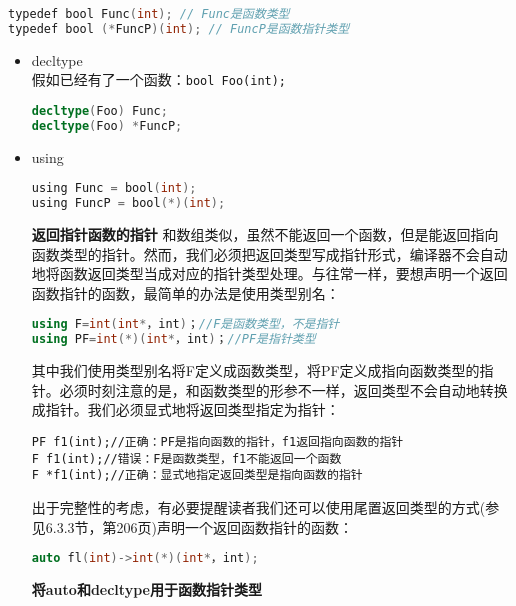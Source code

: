 \documentclass[
  a4paper,
  oneside,tablecaptionabove
]{scrbook}
\begin{document}
\begin{lstlisting}[language={C++}]
typedef bool Func(int); // Func是函数类型
typedef bool (*FuncP)(int); // FuncP是函数指针类型
\end{lstlisting}

\begin{itemize}
\item
  decltype\\
  假如已经有了一个函数：\lstinline!bool Foo(int);!

\begin{lstlisting}[language={C++}]
decltype(Foo) Func;
decltype(Foo) *FuncP;
\end{lstlisting}
\item
  using

\begin{lstlisting}[language={C++}]
using Func = bool(int);
using FuncP = bool(*)(int);
\end{lstlisting}

  \textbf{返回指针函数的指针}
  和数组类似，虽然不能返回一个函数，但是能返回指向函数类型的指针。然而，我们必须把返回类型写成指针形式，编译器不会自动地将函数返回类型当成对应的指针类型处理。与往常一样，要想声明一个返回函数指针的函数，最简单的办法是使用类型别名：

\begin{lstlisting}[language={C++}]
using F=int(int*，int)；//F是函数类型，不是指针
using PF=int(*)(int*，int)；//PF是指针类型
\end{lstlisting}

  其中我们使用类型别名将F定义成函数类型，将PF定义成指向函数类型的指针。必须时刻注意的是，和函数类型的形参不一样，返回类型不会自动地转换成指针。我们必须显式地将返回类型指定为指针：

\begin{lstlisting}
PF f1(int);//正确：PF是指向函数的指针，f1返回指向函数的指针
F f1(int);//错误：F是函数类型，f1不能返回一个函数
F *f1(int);//正确：显式地指定返回类型是指向函数的指针
\end{lstlisting}

  出于完整性的考虑，有必要提醒读者我们还可以使用尾置返回类型的方式(参见6.3.3节，第206页)声明一个返回函数指针的函数：

\begin{lstlisting}[language={C++}]
auto fl(int)->int(*)(int*，int);
\end{lstlisting}

  \textbf{将auto和decltype用于函数指针类型}
\end{itemize}
\end{document}
